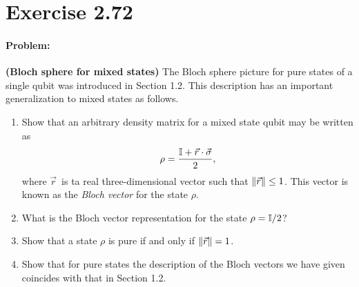 \section*{Exercise 2.72}
\paragraph{Problem:} \textbf{(Bloch sphere for mixed states)} The Bloch sphere picture for pure states of a single qubit was introduced in Section 1.2. This description has an important generalization to mixed states as follows.
\begin{enumerate}[(1)]
    \item Show that an arbitrary density matrix for a mixed state qubit may be written as 
        \begin{equation}
            \rho = \frac{\mathbb{I} + \vec{r} \cdot \vec{\sigma}}{2},
        \end{equation}
    where $\vec{r}$ is ta real three-dimensional vector such that $\norm{\vec{r}} \leq 1$. This vector is known as the \textit{Bloch vector} for the state $\rho$.
    \item What is the Bloch vector representation for the state $\rho = \mathbb{I} / 2$?
    \item Show that a state $\rho$ is pure if and only if $\norm{\vec{r}} = 1$.
    \item Show that for pure states the description of the Bloch vectors we have given coincides with that in Section 1.2.
\end{enumerate}